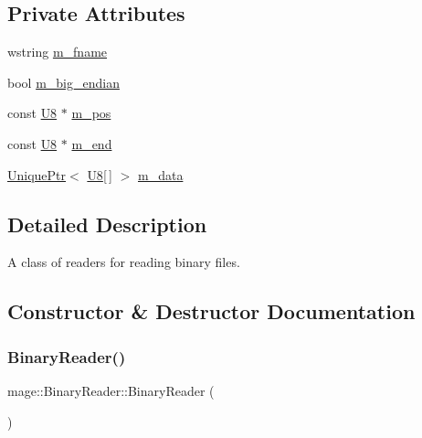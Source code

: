 \subsection*{Private Attributes}
\begin{DoxyCompactItemize}
\item 
wstring \mbox{\hyperlink{classmage_1_1_binary_reader_a9c97c02d53ce60a9952751ad4f55414f}{m\+\_\+fname}}
\item 
bool \mbox{\hyperlink{classmage_1_1_binary_reader_a8d23fde958e08efe248edb5d92861113}{m\+\_\+big\+\_\+endian}}
\item 
const \mbox{\hyperlink{namespacemage_afc638980bc6154f15af5e2d93a0e0ea9}{U8}} $\ast$ \mbox{\hyperlink{classmage_1_1_binary_reader_aedb9632de1cf95d5af49499217744ed5}{m\+\_\+pos}}
\item 
const \mbox{\hyperlink{namespacemage_afc638980bc6154f15af5e2d93a0e0ea9}{U8}} $\ast$ \mbox{\hyperlink{classmage_1_1_binary_reader_a19b0f36cb1e8a05aaa9471514242e8ef}{m\+\_\+end}}
\item 
\mbox{\hyperlink{namespacemage_a3316d7143a973e37adf1110f2e80ca31}{Unique\+Ptr}}$<$ \mbox{\hyperlink{namespacemage_afc638980bc6154f15af5e2d93a0e0ea9}{U8}}\mbox{[}$\,$\mbox{]} $>$ \mbox{\hyperlink{classmage_1_1_binary_reader_a529bdcb620e1250aa0b12716c9b7eae1}{m\+\_\+data}}
\end{DoxyCompactItemize}


\subsection{Detailed Description}
A class of readers for reading binary files. 

\subsection{Constructor \& Destructor Documentation}
\mbox{\label{classmage_1_1_binary_reader_aab82579cef4f2f022273cf1adfcc8497}} 
\subsubsection{\texorpdfstring{Binary\+Reader()}{BinaryReader()}\hspace{0.1cm}{\footnotesize\ttfamily [1/3]}}
{\footnotesize\ttfamily mage\+::\+Binary\+Reader\+::\+Binary\+Reader (\begin{DoxyParamCaption}{ }\end{DoxyParamCaption})\hspace{0.3cm}{\ttfamily [protected]}}

